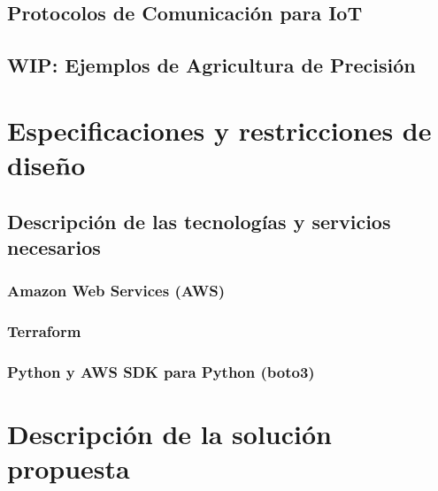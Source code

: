 \documentclass[12pt]{article}
\begin{document}
\subsection{Protocolos de Comunicación para IoT}


\subsection{WIP: Ejemplos de Agricultura de Precisión}


\section{Especificaciones y restricciones de diseño}


\subsection{Descripción de las tecnologías y servicios necesarios}


\subsubsection{Amazon Web Services (AWS)}


\subsubsection{Terraform}


\subsubsection{Python y AWS SDK para Python (boto3)}


\section{Descripción de la solución propuesta}
\end{document}
